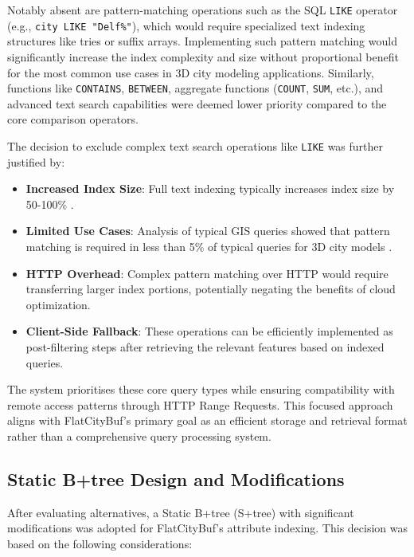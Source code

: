 Notably absent are pattern-matching operations such as the SQL \texttt{LIKE} operator (e.g., \texttt{city LIKE "Delf\%"}), which would require specialized text indexing structures like tries or suffix arrays. Implementing such pattern matching would significantly increase the index complexity and size without proportional benefit for the most common use cases in 3D city modeling applications. Similarly, functions like \texttt{CONTAINS}, \texttt{BETWEEN}, aggregate functions (\texttt{COUNT}, \texttt{SUM}, etc.), and advanced text search capabilities were deemed lower priority compared to the core comparison operators.

The decision to exclude complex text search operations like \texttt{LIKE} was further justified by:

\begin{itemize}
    \item \textbf{Increased Index Size}: Full text indexing typically increases index size by 50-100\% \citep{leis_2016}.
    \item \textbf{Limited Use Cases}: Analysis of typical GIS queries showed that pattern matching is required in less than 5\% of typical queries for 3D city models \citep{van_dongen_2022}.
    \item \textbf{HTTP Overhead}: Complex pattern matching over HTTP would require transferring larger index portions, potentially negating the benefits of cloud optimization.
    \item \textbf{Client-Side Fallback}: These operations can be efficiently implemented as post-filtering steps after retrieving the relevant features based on indexed queries.
\end{itemize}

The system prioritises these core query types while ensuring compatibility with remote access patterns through HTTP Range Requests. This focused approach aligns with FlatCityBuf's primary goal as an efficient storage and retrieval format rather than a comprehensive query processing system.

\subsection{Static B+tree Design and Modifications}
\label{methodology:attribute_index:static_btree_design}

After evaluating alternatives, a Static B+tree (S+tree) with significant modifications was adopted for FlatCityBuf's attribute indexing. This decision was based on the following considerations:

